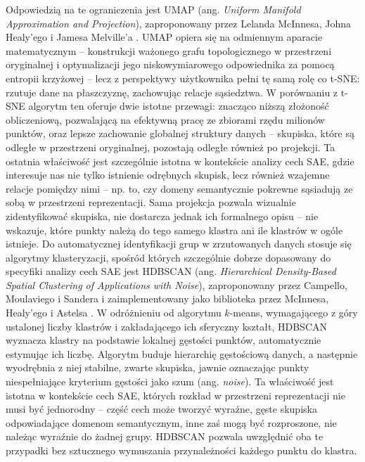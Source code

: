 Odpowiedzią na te ograniczenia jest UMAP (ang. \textit{Uniform Manifold Approximation and Projection}), zaproponowany przez Lelanda McInnesa, Johna Healy'ego i Jamesa Melville'a \cite{mcinnes_2018_umap}. UMAP opiera się na odmiennym aparacie matematycznym -- konstrukcji ważonego grafu topologicznego w przestrzeni oryginalnej i optymalizacji jego niskowymiarowego odpowiednika za pomocą entropii krzyżowej -- lecz z perspektywy użytkownika pełni tę samą rolę co t-SNE: rzutuje dane na płaszczyznę, zachowując relacje sąsiedztwa. W porównaniu z t-SNE algorytm ten oferuje dwie istotne przewagi: znacząco niższą złożoność obliczeniową, pozwalającą na efektywną pracę ze zbiorami rzędu milionów punktów, oraz lepsze zachowanie globalnej struktury danych -- skupiska, które są odległe w przestrzeni oryginalnej, pozostają odległe również po projekcji. Ta ostatnia właściwość jest szczególnie istotna w kontekście analizy cech SAE, gdzie interesuje nas nie tylko istnienie odrębnych skupisk, lecz również wzajemne relacje pomiędzy nimi -- np. to, czy domeny semantycznie pokrewne sąsiadują ze sobą w przestrzeni reprezentacji. \newline
Sama projekcja pozwala wizualnie zidentyfikować skupiska, nie dostarcza jednak ich formalnego opisu -- nie wskazuje, które punkty należą do tego samego klastra ani ile klastrów w ogóle istnieje. Do automatycznej identyfikacji grup w zrzutowanych danych stosuje się algorytmy klasteryzacji, spośród których szczególnie dobrze dopasowany do specyfiki analizy cech SAE jest HDBSCAN (ang. \textit{Hierarchical Density-Based Spatial Clustering of Applications with Noise}), zaproponowany przez Campello, Moulaviego i Sandera \cite{campello_2013_hdbscan} i zaimplementowany jako biblioteka przez McInnesa, Healy'ego i Astelsa \cite{mcinnes_2017_hdbscan}. W odróżnieniu od algorytmu $k$-means, wymagającego z góry ustalonej liczby klastrów i zakładającego ich sferyczny kształt, HDBSCAN wyznacza klastry na podstawie lokalnej gęstości punktów, automatycznie estymując ich liczbę. Algorytm buduje hierarchię gęstościową danych, a następnie wyodrębnia z niej stabilne, zwarte skupiska, jawnie oznaczając punkty niespełniające kryterium gęstości jako szum (ang. \textit{noise}). Ta właściwość jest istotna w kontekście cech SAE, których rozkład w przestrzeni reprezentacji nie musi być jednorodny -- część cech może tworzyć wyraźne, gęste skupiska odpowiadające domenom semantycznym, inne zaś mogą być rozproszone, nie należąc wyraźnie do żadnej grupy. HDBSCAN pozwala uwzględnić oba te przypadki bez sztucznego wymuszania przynależności każdego punktu do klastra. \newline
